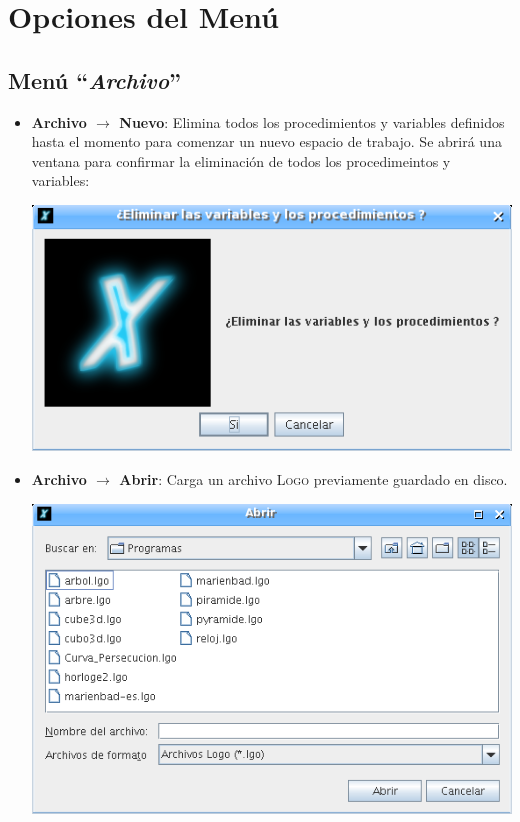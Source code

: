 \chapter{Opciones del Men\'u}
   \label{Opciones-del-Menu}

\section{Men\'u ``\textit{Archivo}''}
   \label{Menu-Archivo}

\begin{itemize}
   \item \textbf{Archivo $\rightarrow$ Nuevo}: Elimina todos los
      procedimientos y variables definidos hasta el momento para comenzar un
      nuevo espacio de trabajo. Se abrir\'a una ventana para confirmar la
      eliminaci\'on de todos los procedimeintos y variables:
      \begin{center}
         \includegraphics[scale=0.3]{Imagenes/03_Opciones-Menu/MenuNuevo.png}
      \end{center}
   \item \textbf{Archivo $\rightarrow$ Abrir}: Carga un archivo
      \textsc{Logo} previamente guardado en disco.
      \begin{center}
         \includegraphics[scale=0.3]{Imagenes/03_Opciones-Menu/MenuAbrir.png}

\end{center}
\end{itemize}
